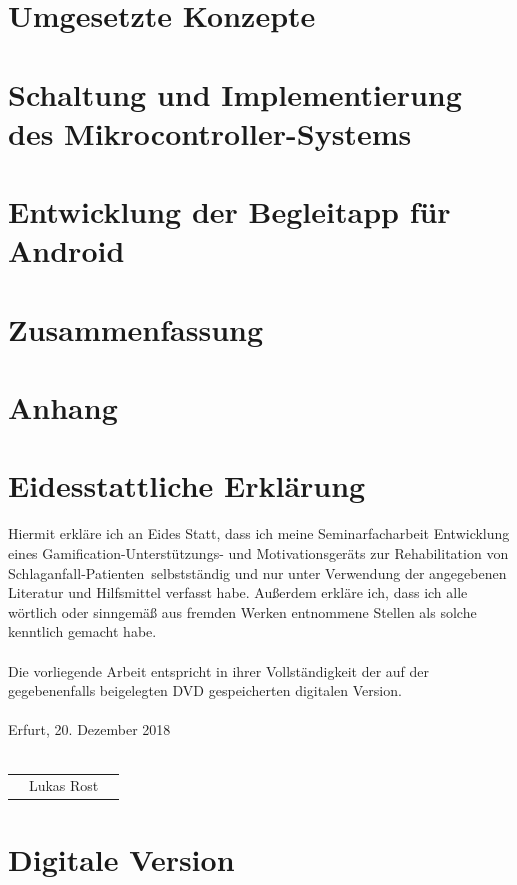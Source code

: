 \documentclass[a4paper, 11pt, titlepage, bibliography=totocnumbered]{scrartcl}
\begin{document}
\newpage
\section{Umgesetzte Konzepte}


\newpage
\section{Schaltung und Implementierung des Mikrocontroller-Systems}


\newpage
\section{Entwicklung der Begleitapp für Android}


\newpage
\section{Zusammenfassung}


\newpage


\newpage
\section{Anhang}


\newpage
\section*{Eidesstattliche Erklärung}
Hiermit erkläre ich an Eides Statt, dass ich meine Seminarfacharbeit \glqq Entwicklung eines Gamification-Unterstützungs- und Motivationsgeräts zur Rehabilitation von Schlaganfall-Patienten\grqq ~selbstständig und nur unter Verwendung der angegebenen Literatur und Hilfsmittel verfasst habe. Außerdem erkläre ich, dass ich alle wörtlich oder sinngemäß aus fremden Werken entnommene Stellen als solche kenntlich gemacht habe.\\ \\
Die vorliegende Arbeit entspricht in ihrer Vollständigkeit der auf der gegebenenfalls beigelegten DVD gespeicherten digitalen Version.
\\ \\
Erfurt, 20. Dezember 2018
\\ \\
\begin{center}
\begin{tabular}{@{}l@{}}\hline
$\: \: \:$ Lukas Rost $\: \: \:$
\end{tabular}
\end{center}

\newpage
\section*{Digitale Version}
\vspace{2cm}
\hspace{0.5cm}
\end{document}
